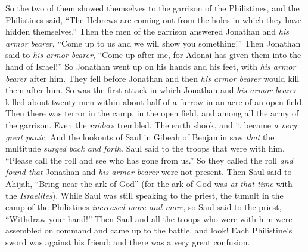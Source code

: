 \begin{biblechapter}
\verse So the two of them showed themselves to the garrison of the Philistines, and the Philistines said, “The Hebrews are coming out from the holes in which they have hidden themselves.”
\verse Then the men of the garrison answered Jonathan and \textit{his armor bearer}, “Come up to us and we will show you something!” Then Jonathan said to \textit{his armor bearer}, “Come up after me, for Adonai has given them into the hand of Israel!”
\verse So Jonathan went up on his hands and his feet, with \textit{his armor bearer} after him. They fell before Jonathan and then \textit{his armor bearer} would kill them after him.
\verse So was the first attack in which Jonathan and \textit{his armor bearer} killed about twenty men within about half of a furrow in an acre of an open field.
\verse Then there was terror in the camp, in the open field, and among all the army of the garrison. Even the \textit{raiders} trembled. The earth shook, and it became \textit{a very great panic}.
\verse And the lookouts of Saul in Gibeah of Benjamin saw \textit{that} the multitude \textit{surged back and forth}.
\verse Saul said to the troops that were with him, “Please call the roll and see who has gone from us.” So they called the roll \textit{and found that} Jonathan and \textit{his armor bearer} were not present.
\verse Then Saul said to Ahijah, “Bring near the ark of God” (for the ark of God was \textit{at that time} with the \textit{Israelites}).
\verse While Saul was still speaking to the priest, the tumult in the camp of the Philistines \textit{increased more and more}, so Saul said to the priest, “Withdraw your hand!”
\verse Then Saul and all the troops who were with him were assembled on command and came up to the battle, and look! Each Philistine’s sword was against his friend; and there was a very great confusion.

\end{biblechapter}
